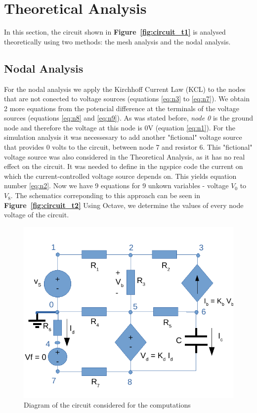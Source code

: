 \section{Theoretical Analysis}
\label{sec:analysis}

In this section, the circuit shown in \textbf{Figure~\ref{fig:circuit_t1}} is analysed
theoretically using two methods: the mesh analysis and the nodal analysis.\par


\subsection{Nodal Analysis} 
For the nodal analysis we apply the Kirchhoff Current Law (KCL) to the nodes that are not conected to voltage sources (equations \ref{eq:n3} to \ref{eq:n7}). We obtain 2 more equations from the potencial difference at the terminals of the voltage sources (equations \ref{eq:n8} and \ref{eq:n9}). As was stated before, {\it node 0} is the ground node and therefore the voltage at this node is 0V (equation \ref{eq:n1}). For the simulation analysis it was necessesary to add another "fictional" voltage source that provides 0 volts to the circuit, between node 7 and resistor 6. This "fictional" voltage source was also considered in the Theoretical Analysis, as it has no real effect on the circuit. It was needed to define in the ngspice code the current on which the current-controlled voltage source depends on. This yields equation number \ref{eq:n2}. Now we have 9 equations for 9 unkown variables - voltage {\it$V_{0}$}  to {\it$V_{8}$}. The schematics correponding to this approach can be seen in \textbf{Figure~\ref{fig:circuit_t2}} Using Octave, we determine the values of every node voltage of the circuit. \par

\begin{figure}[h] \centering
\includegraphics[width=0.9\linewidth]{diagram_t2.pdf}
\caption{Diagram of the circuit considered for the computations}
\label{fig:diagram_t2}
\end{figure}

